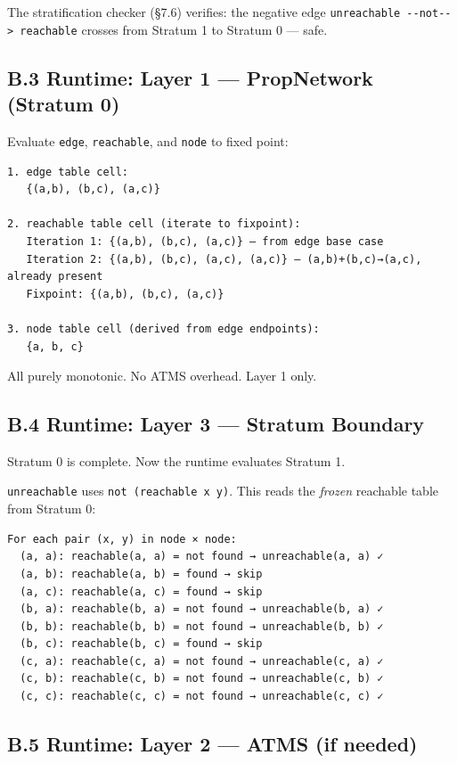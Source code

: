 \documentclass[11pt]{article}
\begin{document}
The stratification checker (§7.6) verifies: the negative edge \texttt{unreachable -{}-{}not-{}-{}> reachable} crosses from Stratum 1 to Stratum 0 — safe.
\subsection{B.3 Runtime: Layer 1 — PropNetwork (Stratum 0)}
\label{sec:org98867e6}

Evaluate \texttt{edge}, \texttt{reachable}, and \texttt{node} to fixed point:

\begin{verbatim}
1. edge table cell:
   {(a,b), (b,c), (a,c)}

2. reachable table cell (iterate to fixpoint):
   Iteration 1: {(a,b), (b,c), (a,c)} — from edge base case
   Iteration 2: {(a,b), (b,c), (a,c), (a,c)} — (a,b)+(b,c)→(a,c), already present
   Fixpoint: {(a,b), (b,c), (a,c)}

3. node table cell (derived from edge endpoints):
   {a, b, c}
\end{verbatim}

All purely monotonic. No ATMS overhead. Layer 1 only.
\subsection{B.4 Runtime: Layer 3 — Stratum Boundary}
\label{sec:org01a3b42}

Stratum 0 is complete. Now the runtime evaluates Stratum 1.

\texttt{unreachable} uses \texttt{not (reachable x y)}. This reads the \emph{frozen} reachable
table from Stratum 0:

\begin{verbatim}
For each pair (x, y) in node × node:
  (a, a): reachable(a, a) = not found → unreachable(a, a) ✓
  (a, b): reachable(a, b) = found → skip
  (a, c): reachable(a, c) = found → skip
  (b, a): reachable(b, a) = not found → unreachable(b, a) ✓
  (b, b): reachable(b, b) = not found → unreachable(b, b) ✓
  (b, c): reachable(b, c) = found → skip
  (c, a): reachable(c, a) = not found → unreachable(c, a) ✓
  (c, b): reachable(c, b) = not found → unreachable(c, b) ✓
  (c, c): reachable(c, c) = not found → unreachable(c, c) ✓
\end{verbatim}
\subsection{B.5 Runtime: Layer 2 — ATMS (if needed)}
\label{sec:org995b5eb}
\end{document}

